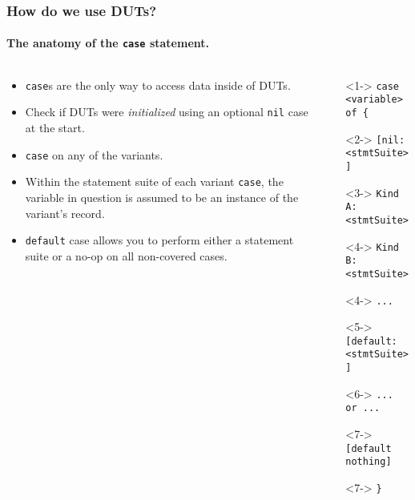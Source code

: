 \documentclass{beamer}
\begin{document}
\begin{frame}
 \frametitle{How do we use DUTs?}
 \framesubtitle{The anatomy of the \texttt{case} statement.}
    \begin{columns}[T,onlytextwidth]
        \begin{column}{.5\textwidth}
            \begin{minipage}{\textwidth}
                \begin{itemize}
                    \item<1-> \texttt{case}s are the only way to access data inside of DUTs.
                    \item<2-> Check if DUTs were \textit{initialized} using an optional \texttt{nil} case at the start.
                    \item<3-> \texttt{case} on any of the variants.
                    \item<4-> Within the statement suite of each variant \texttt{case}, the variable in question is assumed to be an instance of the variant's record.
                    \item<5-> \texttt{default} case allows you to perform either a statement suite or a no-op on all non-covered cases. 
                \end{itemize}
            \end{minipage}
        \end{column}
        \begin{column}{.45\textwidth}
            \begin{onlyenv}
                \begin{minipage}{\textwidth}
                    \setlength{\leftmargini}{0cm}
                    \begin{itemize}[label={},leftmargin=*]
                     \item[]<1-> \texttt{case <variable> of \{}
                     \item[]<2-> \hphantom{~~~~}\texttt{[nil: <stmtSuite>]}
                     \item[]<3-> \hphantom{~~~~}\texttt{Kind A: <stmtSuite>}
                     \item[]<4-> \hphantom{~~~~}\texttt{Kind B: <stmtSuite>}
                     \item[]<4-> \hphantom{~~~~}\texttt{...}
                     \item[]<5-> \hphantom{~~~~}\texttt{[default: <stmtSuite>]}
                     \item[]<6-> \hphantom{~~~~}\texttt{... or ...}
                     \item[]<7-> \hphantom{~~~~}\texttt{[default nothing]}
                     \item[]<7-> \texttt{\}}
                    \end{itemize}


\end{minipage}
\end{onlyenv}
\end{column}
\end{columns}
\end{frame}
\end{document}
